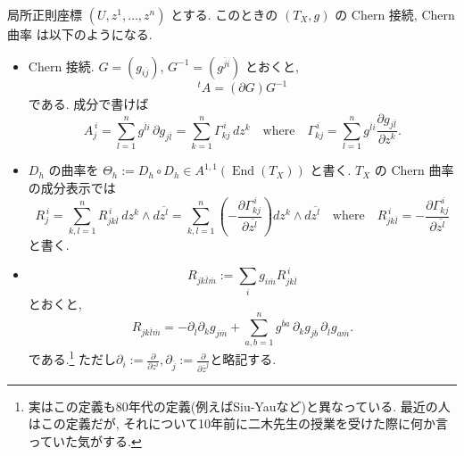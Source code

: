 \documentclass[dvipdfmx,a4paper,11pt]{article} %
\theoremstyle{definition}
\theoremstyle{remark}
\numberwithin{equation}{section}
\newcommand{\End}[0]{\operatorname{End}}
\begin{document}
局所正則座標 \((U,z^1,\ldots,z^n)\) とする. このときの \((T_X, g)\) の Chern 接続, Chern 曲率 は以下のようになる.
\begin{itemize}
\item Chern 接続. \(G=(g_{i\overline j})\), \(G^{-1}=(g^{\overline j i})\) とおくと,
\[
{}^{t}A=(\partial G)G^{-1}
\]
である. 成分で書けば
\[
A_j^{\,i}=\sum_{l=1}^n g^{\overline{l}i}\,\partial g_{j\overline l}
=\sum_{k=1}^n \Gamma_{k j}^{\,i}\,dz^k
\quad 
\text{where}
\quad
\Gamma_{k j}^{\,i}=
\sum_{l=1}^n g^{\overline{l}i}\frac{\partial g_{j\overline l}}{\partial z^k}.
\]
\item \(D_h\) の曲率を
\(
\Theta_h:=D_h\circ D_h\in A^{1,1}(\End(T_X))
\)
と書く. \(T_X\) の Chern 曲率 の成分表示では
\[
R_j^{\,i}
=
\sum_{k,l=1}^n
R_{jk\overline l}^{\,i}\,
dz^k\wedge d\overline{z^l}
=
\sum_{k,l=1}^n
\left(-\frac{\partial \Gamma_{k j}^{\,i}}{\partial \overline{z^l}}\right)
dz^k\wedge d\overline{z^l}
\quad \text{where}\quad
R_{jk\overline l}^{\,i}
=
-\frac{\partial \Gamma_{k j}^{\,i}}{\partial \overline{z^l}}
\]
と書く.
\item
\[
R_{jk\overline l\overline m}:=
\sum_i g_{i\overline m}R_{jk\overline l}^{\,i}
\]
とおくと,
\[
R_{jk\overline l\overline m}
=
-\partial_{\overline l}\partial_k g_{j\overline m}
+
\sum_{a,b=1}^n
g^{\overline b a}\,
\partial_k g_{j\overline b}\,
\partial_{\overline l}g_{a\overline m}.
\]
である.\footnote{実はこの定義も80年代の定義(例えばSiu-Yau\cite{SY80}など)と異なっている. 最近の人はこの定義だが, それについて10年前に二木先生の授業を受けた際に何か言っていた気がする.}
ただし$\partial_{i}:=\frac{\partial}{\partial z^{i}}, \partial_{\overline j}:=\frac{\partial}{\partial \overline{z}^{j}}$と略記する. 
\end{itemize}
\end{document}
